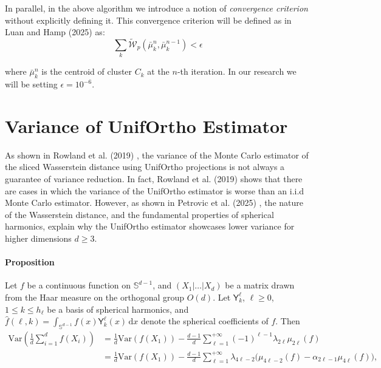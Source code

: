 \documentclass[12pt,a4paper]{report}
\begin{document}
In parallel, in the above algorithm we introduce a notion of \textit{convergence criterion} without explicitly defining it.
This convergence criterion will be defined as in Luan and Hamp (2025) \cite{LuanHamp2025} as: 
\begin{equation}
 \sum_{k} \tilde{\mathcal{W}}_p\!\left(\bar{\mu}_k^{n}, \bar{\mu}_{k}^{n-1}\right) < \epsilon
\end{equation}

where $\bar{\mu}_k^{n}$ is the centroid of cluster $C_k$ at the $n$-th iteration.
In our research we will be setting $\epsilon = 10^{-6}$.




\section{Variance of UnifOrtho Estimator} \label{section:variance_reduc}
As shown in Rowland et al. (2019) \cite{RowlandEtAl2019}, the variance of the Monte Carlo estimator of the sliced Wasserstein distance using UnifOrtho projections is not always a guarantee of variance reduction. 
In fact, Rowland et al. (2019) \cite{RowlandEtAl2019} shows that there are cases in which the variance of the UnifOrtho estimator is worse than an i.i.d Monte Carlo estimator. 
However, as shown in Petrovic et al. (2025) \cite{PetrovicBardenetDesolneux2025}, the nature of the Wasserstein distance, and the fundamental properties of spherical harmonics, explain why the UnifOrtho estimator showcases lower variance for higher dimensions $d \geq 3$. 

\paragraph{Proposition}
Let $f$ be a continuous function on $\mathbb{S}^{d-1}$, and $(X_1 | \ldots | X_d)$ be a matrix drawn from the Haar measure on the orthogonal group $O(d)$. Let $\mathsf{Y}_k^{\ell}$, $\ell \geq 0$, $1 \leq k \leq h_{\ell}$ be a basis of spherical harmonics, and $\hat{f}(\ell, k) = \int_{\mathbb{S}^{d-1}} f(x)\mathsf{Y}_k^{\ell}(x)\,\mathrm{d}x$ denote the spherical coefficients of $f$. Then
\begin{align}
\mathrm{Var}\!\left(\frac{1}{d}\sum_{i=1}^{d} f(X_i)\right)
&= \frac{1}{d}\mathrm{Var}(f(X_1)) - \frac{d-1}{d}\sum_{\ell=1}^{+\infty}(-1)^{\ell-1}\lambda_{2\ell}\mu_{2\ell}(f) \label{variance_red_1} \\
&= \frac{1}{d}\mathrm{Var}(f(X_1)) - \frac{d-1}{d}\sum_{\ell=1}^{+\infty}\lambda_{4\ell-2}\big(\mu_{4\ell-2}(f) - \alpha_{2\ell-1}\mu_{4\ell}(f)\big) \label{variance_red_2},
\end{align}
\end{document}
